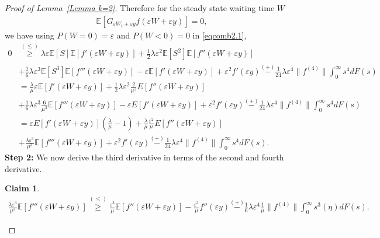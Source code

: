 \documentclass[11pt,letterpaper,reqno]{article}
\theoremstyle{thmstyleone}%
\theoremstyle{thmstyletwo}%
\newtheorem{claim}{Claim}
\theoremstyle{thmstylethree}%
\numberwithin{equation}{section}
\begin{document}
\begin{proof}[Proof of Lemma~\ref{Lemma k=2}]
Therefore for the steady state waiting time $W$ 
\begin{align*}
    \mathbb E[G_{\varepsilon W_t+\varepsilon y}f(\varepsilon W+\varepsilon y) ]=0,
\end{align*}
we have using $P(W=0)=\varepsilon$ and  $P(W<0)=0$ in \eqref{eqcomb2.1},
\begin{align}\label{stg23}
    0 &\stackrel{(\leq)} {\geq} \lambda \varepsilon \mathbb E[S]\mathbb E[f'(\varepsilon W+\varepsilon y)]+\frac{1}{2}\lambda \varepsilon^2 \mathbb E[S^2]\mathbb E[f''(\varepsilon W+\varepsilon y)] \nonumber\\
    &+\frac{1}{6}\lambda \varepsilon^3 \mathbb E[S^3]\mathbb E[f'''(\varepsilon W+\varepsilon y)]-\varepsilon \mathbb E[f'(\varepsilon W+\varepsilon y)]+\varepsilon^2 f'(\varepsilon y)\stackrel{(+)}{-}\frac{1}{24}\lambda \varepsilon^4 \|f^{(4)}\| \int_0^\infty s^4 dF(s) \nonumber\\
    &=\frac{\lambda}{\mu}\varepsilon \mathbb E[f'(\varepsilon W+\varepsilon y)]+\frac{1}{2}\lambda \varepsilon^2 \frac{2}{\mu^2}E[f''(\varepsilon W+\varepsilon y)] \nonumber\\
    &+\frac{1}{6}\lambda \varepsilon^3 \frac{6}{\mu^3}\mathbb E[f'''(\varepsilon W+\varepsilon y)]-\varepsilon E[f'(\varepsilon W+\varepsilon y)]+\varepsilon^2f'(\varepsilon y)\stackrel{(+)}{-}\frac{1}{24}\lambda \varepsilon^4 \|f^{(4)}\| \int_0^\infty s^4 dF(s) \nonumber\\
    &=\varepsilon E[f'(\varepsilon W+\varepsilon y)]\left(\frac{\lambda}{\mu}-1\right)+\frac{\lambda}{\mu}\frac{\varepsilon^2}{\mu}E[f''(\varepsilon W+\varepsilon y)] \nonumber\\
    &+\frac{\lambda \varepsilon^3}{\mu^3}\mathbb E[f'''(\varepsilon W+\varepsilon y)]+\varepsilon^2f'(\varepsilon y)\stackrel{(+)}{-}\frac{1}{24}\lambda \varepsilon^4 \|f^{(4)}\| \int_0^\infty s^4dF(s).
 \end{align}
\textbf{Step 2:} We now derive the third derivative in terms of the second and fourth derivative. %
\begin{claim}
    \begin{align*}
        \frac{\lambda \varepsilon^3}{\mu^3}\mathbb E[f'''(\varepsilon W+\varepsilon y)] \stackrel{(\leq)} {\geq} \frac{\varepsilon^3}{\mu}\mathbb E[f''(\varepsilon W+\varepsilon y)]-\frac{\varepsilon^3}{\mu}f''(\varepsilon y)\stackrel{(+)}{-}\frac{1}{6} \lambda \varepsilon^4 \frac{1}{\mu} \|f^{(4)}\|\int_0^\infty s^3(\eta )dF(s).
    \end{align*}
\end{claim}

\end{proof}
\end{document}
